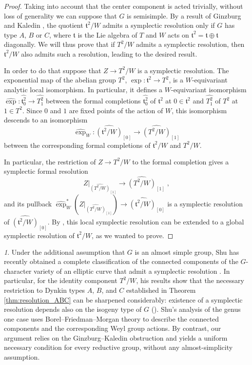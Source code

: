 \documentclass[11pt,english]{amsart}
\numberwithin{equation}{section}
\numberwithin{figure}{section}
\theoremstyle{plain}
\theoremstyle{plain}
\theoremstyle{definition}
\theoremstyle{remark}
\newtheorem{rem}[thm]{\protect\remarkname}
\providecommand{\remarkname}{Remark}
\begin{document}
\begin{proof}
Taking into account that the center component is acted trivially, without loss of generality we can suppose that $G$ is semisimple. By a result of Ginzburg and Kaledin \cite[Theorem 1.1]{GK04}, the quotient $\mathfrak{t}^2 /W$ admits a symplectic resolution only if $G$ has type $A$, $B$ or $C$, where $\mathfrak{t}$ is the Lie algebra of $T$ and $W$ acts on $\mathfrak{t}^2 = \mathfrak{t} \oplus \mathfrak{t}$ diagonally. We will thus prove that if $T^2/W$ admits a symplectic resolution, then $\mathfrak{t}^2/W$ also admits such a resolution, leading to the desired result.

In order to do that suppose that $Z \to T^2/W$ is a symplectic resolution. The exponential map of the abelian group $T^2$, $\exp: \mathfrak{t}^2 \to T^2$, is a $W$-equivariant analytic local isomorphism. In particular, it defines a $W$-equivariant isomorphism $\widehat{\exp}: \widehat{\mathfrak{t}^2_{0}} \to \widehat{T^2_{1}}$ between the formal completions $\widehat{\mathfrak{t}^2_{0}}$ of $\mathfrak{t}^2$ at $0 \in \mathfrak{t}^2$ and $\widehat{T^2_{1}}$ of $T^2$ at $1 \in T^2$. Since $0$ and $1$ are fixed points of the action of $W$, this isomorphism descends to an isomorphism
$$
\widehat{\exp}_W: \widehat{(\mathfrak{t}^2/W)}_{[0]} \to \widehat{(T^2/W)}_{[1]}
$$
between the corresponding formal completions of $\mathfrak{t}^2/W$ and $T^2/W$.

In particular, the restriction of $Z \to T^2/W$ to the formal completion gives a symplectic formal resolution
$$
    Z|_{\widehat{(T^2/W)}_{[1]}} \to \widehat{(T^2/W)}_{[1]}\; ,
$$
and its pullback $\widehat{\exp}_W^*(Z|_{\widehat{(T^2/W)}_{[1]}}) \to \widehat{(\mathfrak{t}^2/W)}_{[0]}$ is a symplectic resolution of $\widehat{(\mathfrak{t}^2/W)}_{[0]}$. By \cite[Theorem 1.4]{kaledin2003crepant}, this local symplectic resolution can be extended to a global symplectic resolution of $\mathfrak{t}^2/W$, as we wanted to prove.
\end{proof}

\begin{rem}
Under the additional assumption that $G$ is an almost simple group, Shu has recently obtained a complete classification of the connected components of the $G$-character variety of an elliptic curve that admit a symplectic resolution \cite[Theorem C]{shu2024singularities}. In particular, for the identity component $T^2/W$, his results show that the necessary restriction to Dynkin types $A$, $B$, and $C$ established in Theorem \ref{thm:resolution_ABC} can be sharpened considerably: existence of a symplectic resolution depends also on the isogeny type of $G$ (\cite[Propositions 7.9, 7.11, and 7.13]{shu2024singularities}). Shu's analysis of the genus one case uses Borel--Friedman--Morgan theory to describe the connected components and the corresponding Weyl group actions. By contrast, our argument relies on the Ginzburg--Kaledin obstruction and yields a uniform necessary condition for every reductive group, without any almost-simplicity assumption.
\end{rem}
\end{document}
